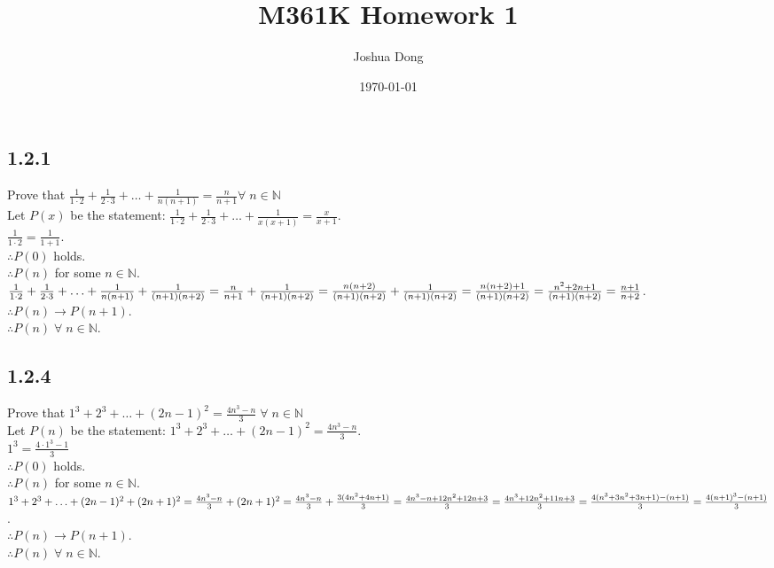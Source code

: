 \documentclass{article}
\begin{document}
\title{M361K\: Homework 1}
\author{Joshua Dong}
\date{\today}
\maketitle

\subsection{1.2.1}
Prove that $\frac{1}{1 \cdot 2} + \frac{1}{2 \cdot 3} + \ldots +
\frac{1}{n (n+1)} = \frac{n}{n+1} \forall \; n \in \mathbb{N}$
\\Let $P(x)$ be the statement: $\frac{1}{1 \cdot 2} + \frac{1}{2 \cdot 3} +
\ldots + \frac{1}{x (x+1)} = \frac{x}{x+1}$.
\\$\frac{1}{1 \cdot 2} = \frac{1}{1+1}$.
\\$\therefore P(0)$ holds.
\\$\therefore P(n)$ for some $n \in \mathbb{N}$.
\\$\frac{1}{1 \cdot 2} + \frac{1}{2 \cdot 3} + \ldots +
\frac{1}{n (n+1)} + \frac{1}{(n+1)(n+2)} =
\\\frac{n}{n+1} + \frac{1}{(n+1)(n+2)} =
\frac{n(n+2)}{(n+1)(n+2)} + \frac{1}{(n+1)(n+2)} =
\frac{n(n+2)+1}{(n+1)(n+2)} = \frac{n^2+2n+1}{(n+1)(n+2)} =
\frac{n+1}{n+2}$.
\\$\therefore P(n) \rightarrow P(n+1)$.
\\$\therefore P(n) \; \forall \; n \in \mathbb{N}$.

\subsection{1.2.4}
Prove that $1^3 + 2^3 + \ldots + (2n-1)^2 =
\frac{4n^3-n}{3} \; \forall \; n \in \mathbb{N}$
\\Let $P(n)$ be the statement: $1^3 + 2^3 + \ldots + (2n-1)^2 =
\frac{4n^3-n}{3}$.
\\$1^3 = \frac{4 \cdot 1^3-1}{3}$
\\$\therefore P(0)$ holds.
\\$\therefore P(n)$ for some $n \in \mathbb{N}$.
\\$1^3 + 2^3 + \ldots + (2n-1)^2 + (2n+1)^2 =
\frac{4n^3-n}{3} + (2n+1)^2 =
\\\frac{4n^3-n}{3} + \frac{3(4n^2+4n+1)}{3} =
\frac{4n^3-n+12n^2+12n+3}{3} = \frac{4n^3+12n^2+11n+3}{3} = 
\frac{4(n^3+3n^2+3n+1)-(n+1)}{3} = 
\frac{4(n+1)^3-(n+1)}{3}$.
\\$\therefore P(n) \rightarrow P(n+1)$.
\\$\therefore P(n) \; \forall \; n \in \mathbb{N}$.
\end{document}
